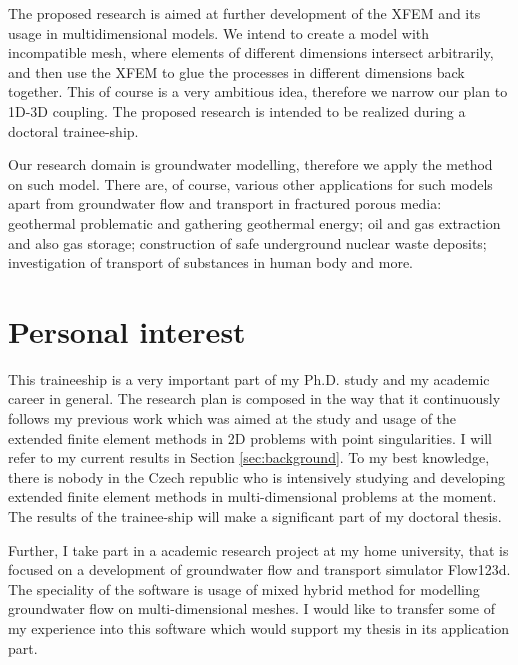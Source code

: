 \documentclass{sna}
\begin{document}
The proposed research is aimed at further development of the XFEM and its usage in multidimensional models. 
We intend to create a model with incompatible mesh, where elements of different dimensions intersect
arbitrarily, and then use the XFEM to glue the processes in different dimensions back together. This of course is a very ambitious
idea, therefore we narrow our plan to 1D-3D coupling. 
The proposed research is intended to be realized during a doctoral trainee-ship. 

Our research domain is groundwater modelling, therefore we apply the method on such model.
There are, of course, various other applications for such models apart from groundwater flow and transport in fractured porous media:
geothermal problematic and gathering geothermal energy; oil and gas extraction and also gas storage;
construction of safe underground nuclear waste deposits; investigation of transport of substances in human body
and more.






\section{Personal interest}
This traineeship is a very important part of my Ph.D. study and my academic career in general.
The research plan is composed in the way that it continuously follows my previous work which was
aimed at the study and usage of the extended finite element methods in 2D problems with point singularities.
I will refer to my current results in Section \ref{sec:background}.
To my best knowledge, there is nobody in the Czech republic who is intensively studying and developing extended finite element
methods in multi-dimensional problems at the moment. The results of the trainee-ship will make a significant part 
of my doctoral thesis.

Further, I take part in a academic research project at my home university, that is focused on a development
of groundwater flow and transport simulator Flow123d. The speciality of the software is usage of mixed hybrid method
for modelling groundwater flow on multi-dimensional meshes. I would like to transfer some of my experience
into this software which would support my thesis in its application part.
\end{document}
